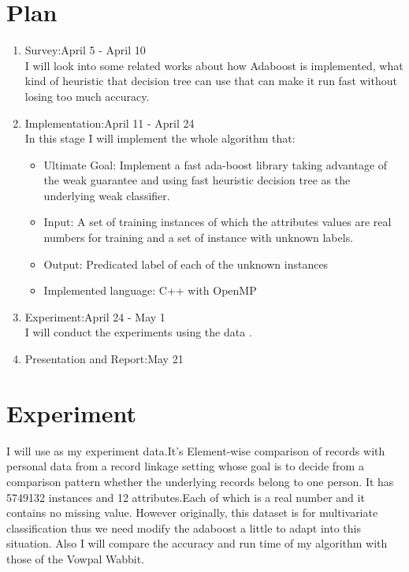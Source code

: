 \documentclass[11pt,twocolumn]{article}
\begin{document}
\section{Plan}
\begin{enumerate}
\item{Survey:April 5 - April 10}\\
I will look into some related works about how Adaboost is implemented, what kind of heuristic that decision tree can use that
can make it run fast without losing too much accuracy.
\item{Implementation:April 11 - April 24}\\

In this stage I will implement the whole algorithm that:
\begin{itemize}
\item{Ultimate Goal}:
	Implement a fast ada-boost library taking advantage of the weak guarantee and using fast heuristic decision tree as the underlying
weak classifier.

\item{Input}:
	A set of training instances of which the attributes values are real numbers for training and a set of instance with unknown labels.
	
\item{Output}:
	Predicated label of each of the unknown instances

\item{Implemented language}:
	C++ with OpenMP
\end{itemize}
\item{Experiment:April 24 - May 1}\\
I will conduct the experiments using the data \cite{Record_Linkage}.
\item{Presentation and Report:May 21}\\
\end{enumerate}

\section{Experiment}
\par{
I will use \cite{Record_Linkage} as my experiment data.It's Element-wise comparison of records with personal data from a record linkage setting whose goal is to decide from a comparison pattern whether the underlying records belong to one person.
It has 5749132 instances and 12 attributes.Each of which is a real number and it contains no missing value. However originally,
this dataset is for multivariate classification thus we need modify the adaboost a little to adapt into this situation.
Also I will compare the accuracy and run time of my algorithm with those of the Vowpal Wabbit.}


\end{document}
